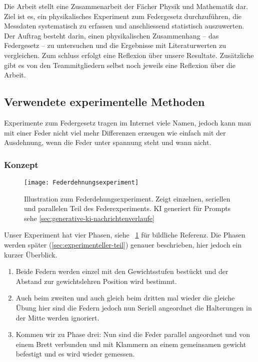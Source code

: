 \documentclass[../main.tex]{subfiles} %
\begin{document}
        Die Arbeit stellt eine Zusammenarbeit der Fächer Physik und Mathematik dar.
        Ziel ist es, ein physikalisches Experiment zum Federgesetz durchzuführen, die Messdaten systematisch zu erfassen und anschliessend statistisch auszuwerten.
        Der Auftrag besteht darin, einen physikalischen Zusammenhang – das Federgesetz – zu untersuchen und die Ergebnisse mit Literaturwerten zu vergleichen.
        Zum schluss erfolgt eine Reflexion über unsere Resultate.
        Zusätzliche gibt es von den Teammitgliedern selbst noch jeweils eine Reflexion über die Arbeit.


    \subsection{Verwendete experimentelle Methoden}\label{subsec:verwendete-experimentelle-methoden}

        Experimente zum Federgesetz tragen im Internet viele Namen, jedoch kann man mit einer Feder nicht viel mehr Differenzen
        erzeugen wie einfach mit der Ausdehnung, wenn die Feder unter spannung steht und wann nicht.

        \subsubsection{Konzept}\label{subsubsec:konzept}

            \begin{figure}[ht]
                \centering
                \texttt{[image: Federdehnungsexperiment]}
                \caption{Illustration zum Federdehungsexperiment. Zeigt einzelnen, seriellen und parallelen Teil des Federexperiments. KI generiert für Prompts sehe \ref{sec:generative-ki-nachrichtenverlaufe}}
                \label{fig:mesh1}
            \end{figure}

            Unser Experiment hat vier Phasen, siehe ~\ref{fig:mesh1} für bildliche Referenz.
            Die Phasen werden später (\ref{sec:experimenteller-teil}) genauer beschrieben, hier jedoch ein kurzer Überblick.
            \begin{enumerate}
                \item Beide Federn werden einzel mit den Gewichtsstufen bestückt und der Abstand zur gewichtslehren Position wird bestimmt.
                \item Auch beim zweiten und auch gleich beim dritten mal wieder die gleiche Übung hier sind die Federn jedoch nun Seriell angeordnet die Halterungen in der Mitte werden ignoriert.
                \item Kommen wir zu Phase drei: Nun sind die Feder parallel angeordnet und von einem Brett verbunden und mit Klammern an einem gemeinsamen gewicht befestigt und es wird wieder gemessen.
            \end{enumerate}
\end{document}
